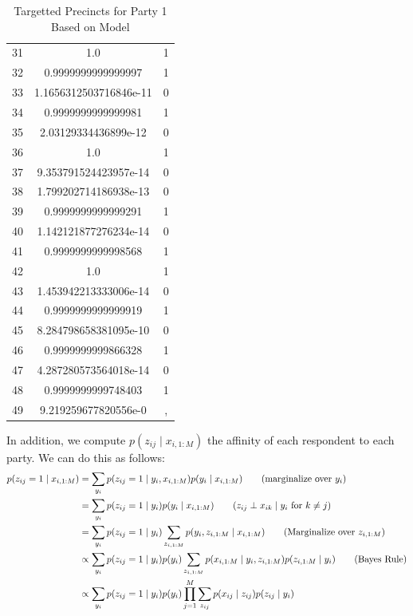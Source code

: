 \documentclass[12pt]{article}
\begin{document}
\begin{enumerate}[label=(\Alph*)]
\begin{enumerate}[label=(\roman*)]
\begin{table}
\begin{tabular}{ |c|c|c| }
						 31 &  1.0 & 1 \\
						 32 &  0.9999999999999997 & 1 \\
						 33 &  1.1656312503716846e-11 & 0 \\
						 34 &  0.9999999999999981 & 1 \\
						 35 &  2.03129334436899e-12 & 0 \\
						 36 &  1.0 & 1 \\
						 37 &  9.353791524423957e-14 & 0 \\
						 38 &  1.799202714186938e-13 & 0 \\
						 39 &  0.9999999999999291 & 1 \\
						 40 &  1.142121877276234e-14 & 0 \\
						 41 &  0.9999999999998568 & 1 \\
						 42 &  1.0 & 1 \\
						 43 &  1.453942213333006e-14 & 0 \\
						 44 &  0.9999999999999919 & 1 \\
						 45 &  8.284798658381095e-10 & 0 \\
						 46 &  0.9999999999866328 & 1 \\
						 47 &  4.287280573564018e-14 & 0 \\
						 48 &  0.9999999999748403 & 1 \\
						 49 &  9.219259677820556e-0 &,  \\
					 \hline
				\end{tabular}
  			\caption{Targetted Precincts for Party 1 Based on Model}
  			\label{tab:targets_1}
  		\end{table}
  		In addition, we compute $p(z_{ij} \mid x_{i, 1:M})$ the affinity of each respondent to each party. We can do this as follows:
  		\begin{align*}
  			p(z_{ij} = 1 \mid x_{i, 1:M}) &= \sum_{y_i} p(z_{ij} = 1 \mid y_i, x_{i,1:M})p(y_i \mid x_{i, 1:M}) \tag{marginalize over $y_i$} \\
  			&= \sum_{y_i} p(z_{ij} = 1 \mid y_i)p(y_i \mid x_{i,1:M}) \tag{$z_{ij} \perp x_{ik} \mid y_i$ for $k \neq j$} \\
  			&= \sum_{y_i} p(z_{ij} = 1 \mid y_i) \sum_{z_{i,1:M}} p(y_i, z_{i, 1:M} \mid x_{i,1:M}) \tag{Marginalize over $z_{i,1:M}$} \\
  			&\propto  \sum_{y_i} p(z_{ij} = 1 \mid y_i)p(y_i) \sum_{z_{i, 1:M}} p(x_{i,1:M} \mid y_i, z_{i,1:M})p(z_{i, 1:M} \mid y_i) \tag{Bayes Rule} \\
  			&\propto \sum_{y_i} p(z_{ij} = 1 \mid y_i)p(y_i) \prod_{j=1}^M \sum_{z_{ij}} p(x_{ij} \mid z_{ij})p(z_{ij} \mid y_i)
  		\end{align*}



\end{enumerate}
\end{enumerate}
\end{document}
